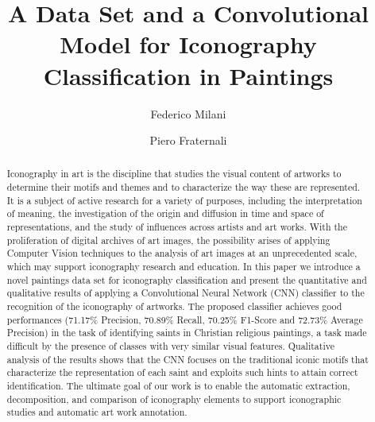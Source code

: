 \documentclass[acmlarge]{acmart}
\begin{document}
\title{A Data Set and a Convolutional Model for Iconography Classification in Paintings}

\author{Federico Milani}
\author{Piero Fraternali}

\renewcommand{\shortauthors}{Milani, et al.}
\renewcommand\tabularxcolumn[1]{m{#1}}

\begin{abstract}
Iconography in art is the discipline that studies the visual content of artworks to determine their motifs and themes and to characterize the way these are represented. It is a subject of active research  for a variety of purposes, including the interpretation of meaning,  the investigation of the origin and diffusion in time and space of representations, and the study of influences across artists and art works. With the proliferation of digital archives of art images, the possibility arises of applying Computer Vision techniques to the  analysis of art images at an unprecedented scale, which may support iconography research  and education. In this paper we introduce a novel paintings data set for iconography classification and  present the   quantitative and qualitative results of applying a Convolutional Neural Network (CNN) classifier to the   recognition of the iconography of artworks. The proposed classifier achieves good performances (71.17\% Precision, 70.89\% Recall, 70.25\% F1-Score and 72.73\% Average Precision) in the task of identifying saints in Christian religious paintings, a task made difficult by the presence of classes with very similar visual features. Qualitative analysis of the results shows that the CNN focuses on the traditional iconic motifs that characterize the representation of each saint and exploits such hints to attain correct identification. The ultimate goal of our work is to enable the automatic extraction, decomposition,  and comparison of iconography elements to support iconographic studies and automatic art work annotation.
\end{abstract}
\end{document}

